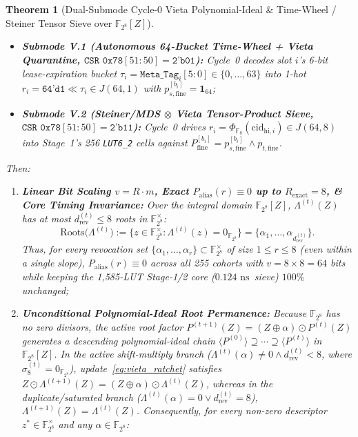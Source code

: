 \documentclass[10pt,twocolumn]{article}
\providecommand{\CoreClbLuts}{1,585}
\providecommand{\StageOneNs}{\ensuremath{0.124\text{~ns}}}
\providecommand{\CorePhysicalLUTs}{\CoreClbLuts}
\providecommand{\StageOneSieveDelayNs}{\StageOneNs}
\theoremstyle{spectralthm}
\newtheorem{theorem}{Theorem}[section]
\begin{document}
\begin{theorem}[Dual-Submode Cycle-0 Vieta Polynomial-Ideal \& Time-Wheel / Steiner Tensor Sieve over {$\mathbb{F}_{2^8}[Z]$}]
\begin{itemize}
  \item \textbf{Submode V.1 (Autonomous 64-Bucket Time-Wheel + Vieta Quarantine, $\texttt{CSR 0x78}[51:50] = \texttt{2'b01}$):} Cycle~0 decodes slot $i$'s 6-bit lease-expiration bucket $\tau_i = \texttt{Meta\_Tag}_i[5:0] \in \{0,\ldots,63\}$ into 1-hot $r_i = \texttt{64'd1} \ll \tau_i \in J(64,1)$ with $p_{s,\mathrm{fine}}^{[b_i]} = \mathbf{1}_{64}$;
  \item \textbf{Submode V.2 (Steiner/MDS $\otimes$ Vieta Tensor-Product Sieve, $\texttt{CSR 0x78}[51:50] = \texttt{2'b11}$):} Cycle~0 drives $r_i = \Phi_{\mathbb{F}_8}(\mathrm{cid}_{\mathrm{hi},i}) \in J(64,8)$ into Stage~1's 256 \mbox{\texttt{LUT6\_2}} cells against $P_{\mathrm{fine}}^{[b_i]} = p_{s,\mathrm{fine}}^{[b_i]} \wedge p_{t,\mathrm{fine}}$.
\end{itemize}
Then:
\begin{enumerate}
  \item[(i)] \textbf{Linear Bit Scaling $v = R \cdot m$, Exact $P_{\mathrm{alias}}(r) \equiv 0$ up to $R_{\mathrm{exact}} = 8$, \& Core Timing Invariance:} Over the integral domain $\mathbb{F}_{2^8}[Z]$, $\Lambda^{(t)}(Z)$ has at most $d_{\mathrm{rev}}^{(t)} \le 8$ roots in $\mathbb{F}_{2^8}^\times$:
  \begin{equation}
  \label{eq:vieta_roots}
  \mathrm{Roots}\bigl(\Lambda^{(t)}\bigr) := \bigl\{z \in \mathbb{F}_{2^8}^\times : \Lambda^{(t)}(z) = 0_{\mathbb{F}_{2^8}}\bigr\}
  = \bigl\{\alpha_1, \ldots, \alpha_{d_{\mathrm{rev}}^{(t)}}\bigr\}.
  \end{equation}
  Thus, for every revocation set $\{\alpha_1,\ldots,\alpha_r\} \subset \mathbb{F}_{2^8}^\times$ of size $1 \le r \le 8$ (even within a single slope), $P_{\mathrm{alias}}(r) \equiv 0$ across all 255 cohorts with $v = 8 \times 8 = 64$ bits while keeping the \CorePhysicalLUTs-LUT Stage-1/2 core (\StageOneSieveDelayNs\ sieve) $100\%$ unchanged;
  \item[(ii)] \textbf{Unconditional Polynomial-Ideal Root Permanence:} Because $\mathbb{F}_{2^8}$ has no zero divisors, the active root factor $P^{(t+1)}(Z) = (Z \oplus \alpha) \odot P^{(t)}(Z)$ generates a descending polynomial-ideal chain $\langle P^{(0)} \rangle \supseteq \cdots \supseteq \langle P^{(t)} \rangle$ in $\mathbb{F}_{2^8}[Z]$. In the active shift-multiply branch ($\Lambda^{(t)}(\alpha) \neq 0 \wedge d_{\mathrm{rev}}^{(t)} < 8$, where $\sigma_8^{(t)} = 0_{\mathbb{F}_{2^8}}$), update~\eqref{eq:vieta_ratchet} satisfies $Z \odot \Lambda^{(t+1)}(Z) = (Z \oplus \alpha) \odot \Lambda^{(t)}(Z)$, whereas in the duplicate/saturated branch ($\Lambda^{(t)}(\alpha) = 0 \vee d_{\mathrm{rev}}^{(t)} = 8$), $\Lambda^{(t+1)}(Z) = \Lambda^{(t)}(Z)$. Consequently, for every non-zero descriptor $z^* \in \mathbb{F}_{2^8}^\times$ and any $\alpha \in \mathbb{F}_{2^8}$:

\end{enumerate}
\end{theorem}
\end{document}
